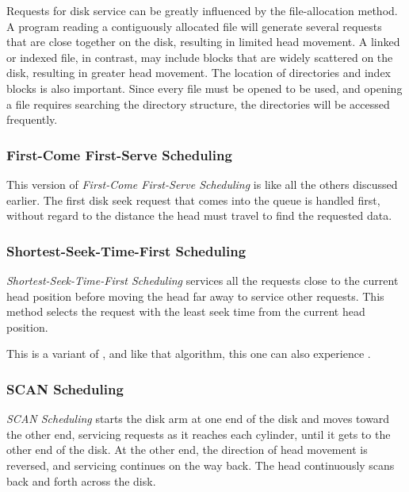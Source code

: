 Requests for disk service can be greatly influenced by the file-allocation method.
A program reading a contiguously allocated file will generate several requests that are close together on the disk, resulting in limited head movement.
A linked or indexed file, in contrast, may include blocks that are widely scattered on the disk, resulting in greater head movement.
The location of directories and index blocks is also important.
Since every file must be opened to be used, and opening a file requires searching the directory structure, the directories will be accessed frequently.

\subsubsection{First-Come First-Serve Scheduling}\label{subsubsec:FCFS_Disk_Scheduling}
This version of \emph{First-Come First-Serve Scheduling} is like all the others discussed earlier.
The first disk seek request that comes into the queue is handled first, without regard to the distance the head must travel to find the requested data.

\subsubsection{Shortest-Seek-Time-First Scheduling}\label{subsubsec:SSTF_Disk_Scheduling}
\emph{Shortest-Seek-Time-First Scheduling} services all the requests close to the current head position before moving the head far away to service other requests.
This method selects the request with the least seek time from the current head position.

This is a variant of , and like that algorithm, this one can also experience .

\subsubsection{SCAN Scheduling}\label{subsubsec:SCAN_Disk_Scheduling}
\emph{SCAN Scheduling} starts the disk arm at one end of the disk and moves toward the other end, servicing requests as it reaches each cylinder, until it gets to the other end of the disk.
At the other end, the direction of head movement is reversed, and servicing continues on the way back.
The head continuously scans back and forth across the disk.


